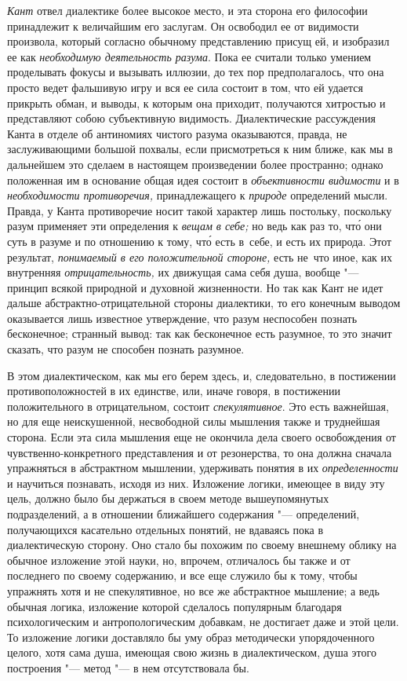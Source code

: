 {\em Кант} отвел диалектике более высокое место, и эта
сторона его философии принадлежит к величайшим его заслугам. Он освободил
ее от видимости произвола, который согласно обычному представлению присущ
ей, и изобразил ее как {\em необходимую деятельность разума}.
Пока ее считали только умением проделывать фокусы и
вызывать иллюзии, до тех пор предполагалось, что она просто ведет фальшивую
игру и вся ее сила состоит в том, что ей удается прикрыть обман, и выводы,
к которым она приходит, получаются хитростью и представляют собою
субъективную видимость. Диалектические рассуждения Канта в отделе об
антиномиях чистого разума оказываются, правда, не заслуживающими большой
похвалы, если присмотреться к ним ближе, как мы в дальнейшем это сделаем в
настоящем произведении более пространно; однако положенная им в основание
общая идея состоит в {\em объективности видимости} и в
{\em необходимости противоречия,} принадлежащего к {\em природе}
определений мысли.
Правда, у Канта противоречие носит такой характер лишь постольку, поскольку
разум применяет эти определения к {\em вещам в себе;}
но ведь как раз то, чт\'{о} они суть в разуме и по отношению к тому,
чт\'{о} есть в~себе, и есть их природа. Этот результат,
{\em понимаемый в его положительной стороне,} есть не~что иное,
как их внутренняя {\em отрицательность,} их
движущая сама себя душа, вообще "--- принцип всякой природной и духовной
жизненности. Но так как Кант не идет дальше абстрактно-отрицательной
стороны диалектики, то его конечным выводом оказывается лишь известное
утверждение, что разум неспособен познать бесконечное; странный вывод: так
как бесконечное есть разумное, то это значит сказать, что разум не способен
познать разумное.

В этом диалектическом, как мы его берем здесь, и, следовательно, в
постижении противоположностей в их единстве, или, иначе говоря, в
постижении положительного в отрицательном, состоит
{\em спекулятивное}. Это есть важнейшая, но для еще
неискушенной, несвободной силы мышления также и труднейшая сторона. Если
эта сила мышления еще не окончила дела своего освобождения от
чувственно-конкретного представления и от резонерства, то она должна
сначала упражняться в абстрактном мышлении, удерживать понятия в их
{\em определенности} и научиться познавать, исходя из
них. Изложение логики, имеющее в виду эту цель, должно было бы держаться в
своем методе вышеупомянутых подразделений, а в отношении ближайшего
содержания "--- определений, получающихся касательно отдельных понятий, не
вдаваясь пока в диалектическую сторону. Оно стало бы похожим по своему
внешнему облику на обычное изложение этой науки, но, впрочем, отличалось бы
также и от последнего по своему содержанию, и все еще служило бы к тому,
чтобы упражнять хотя и не спекулятивное, но все же абстрактное мышление; а
ведь обычная логика, изложение которой сделалось популярным благодаря
психологическим и антропологическим добавкам, не достигает даже и этой
цели. То изложение логики доставляло бы уму образ методически
упорядоченного целого, хотя сама душа, имеющая свою жизнь в диалектическом,
душа этого построения "--- метод "--- в нем отсутствовала бы.

